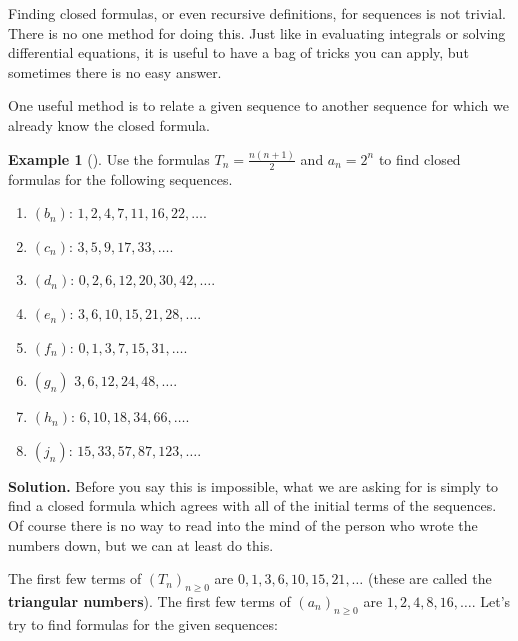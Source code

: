 \documentclass[10pt,]{book}
\newcommand{\terminology}[1]{\textbf{#1}}
\theoremstyle{plain}
\theoremstyle{definition}
\theoremstyle{definition}
\newtheorem{example}[theorem]{Example}
\theoremstyle{definition}
\theoremstyle{definition}
\numberwithin{equation}{chapter}
\begin{document}
\hypertarget{p-61}{}%
Finding closed formulas, or even recursive definitions, for sequences is not trivial. There is no one method for doing this. Just like in evaluating integrals or solving differential equations, it is useful to have a bag of tricks you can apply, but sometimes there is no easy answer.%
\par
\hypertarget{p-62}{}%
One useful method is to relate a given sequence to another sequence for which we already know the closed formula.%
\begin{example}[]\label{example-4}
\hypertarget{p-63}{}%
Use the formulas \(T_n = \frac{n(n+1)}{2}\) and \(a_n = 2^n\) to find closed formulas for the following sequences. \leavevmode%
\begin{enumerate}
\item\hypertarget{li-38}{}\hypertarget{p-64}{}%
\((b_n)\): \(1, 2, 4, 7, 11, 16, 22, \ldots \).%
\item\hypertarget{li-39}{}\hypertarget{p-65}{}%
\((c_n)\): \(3, 5, 9, 17, 33,\ldots \).%
\item\hypertarget{li-40}{}\hypertarget{p-66}{}%
\((d_n)\): \(0, 2, 6, 12, 20, 30, 42,\ldots \).%
\item\hypertarget{li-41}{}\hypertarget{p-67}{}%
\((e_n)\): \(3, 6, 10, 15, 21, 28, \ldots\).%
\item\hypertarget{li-42}{}\hypertarget{p-68}{}%
\((f_n)\): \(0, 1, 3, 7, 15, 31, \ldots \).%
\item\hypertarget{li-43}{}\hypertarget{p-69}{}%
\((g_n)\) \(3, 6, 12, 24, 48, \ldots \).%
\item\hypertarget{li-44}{}\hypertarget{p-70}{}%
\((h_n)\): \(6, 10, 18, 34, 66, \ldots \).%
\item\hypertarget{li-45}{}\hypertarget{p-71}{}%
\((j_n)\): \(15, 33, 57, 87, 123, \ldots\).%
\end{enumerate}
%
\par\smallskip%
\noindent\textbf{Solution.}\hypertarget{solution-3}{}\quad%
\hypertarget{p-72}{}%
Before you say this is impossible, what we are asking for is simply to find a closed formula which agrees with all of the initial terms of the sequences. Of course there is no way to read into the mind of the person who wrote the numbers down, but we can at least do this.%
\par
\hypertarget{p-73}{}%
The first few terms of \((T_n)_{n\ge 0}\)\label{notation-2}
 are \(0, 1, 3, 6, 10, 15, 21, \ldots\) (these are called the \terminology{triangular numbers}). The first few terms of \((a_n)_{n\ge 0}\) are \(1, 2, 4, 8, 16, \ldots\).  Let's try to find formulas for the given sequences: \leavevmode%

\end{example}
\end{document}
